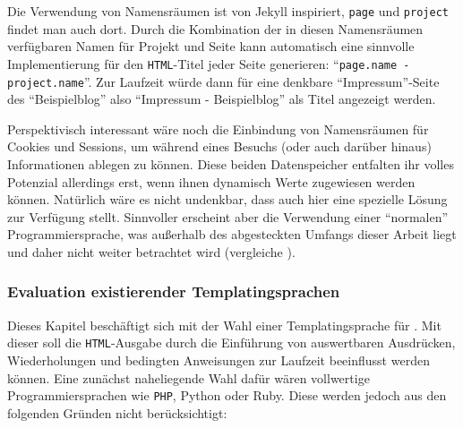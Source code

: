 Die Verwendung von Namensräumen ist von Jekyll inspiriert, \texttt{page} und \texttt{project} findet man auch dort. Durch die Kombination der in diesen Namensräumen verfügbaren Namen für Projekt und Seite kann \idename{} automatisch eine sinnvolle Implementierung für den \texttt{HTML}-Titel jeder Seite generieren: "`\texttt{page.name - project.name}"'. Zur Laufzeit würde dann für eine denkbare "`Impressum"'-Seite des "`Beispielblog"' also "`Impressum - Beispielblog"' als Titel angezeigt werden.

Perspektivisch interessant wäre noch die Einbindung von Namensräumen für Cookies und Sessions, um während eines Besuchs (oder auch darüber hinaus) Informationen ablegen zu können. Diese beiden Datenspeicher entfalten ihr volles Potenzial allerdings erst, wenn ihnen dynamisch Werte zugewiesen werden können. Natürlich wäre es nicht undenkbar, dass \idename{} auch hier eine spezielle Lösung zur Verfügung stellt. Sinnvoller erscheint aber die Verwendung einer "`normalen"' Programmiersprache, was außerhalb des abgesteckten Umfangs dieser Arbeit liegt und daher nicht weiter betrachtet wird (vergleiche ).

\subsubsection{Evaluation existierender Templatingsprachen}
\label{sec:eval-templating-language}

Dieses Kapitel beschäftigt sich mit der Wahl einer Templatingsprache für \idename{}. Mit dieser soll die \texttt{HTML}-Ausgabe durch die Einführung von auswertbaren Ausdrücken, Wiederholungen und bedingten Anweisungen zur Laufzeit beeinflusst werden können. Eine zunächst naheliegende Wahl dafür wären vollwertige Programmiersprachen wie \texttt{PHP}, Python oder Ruby. Diese werden jedoch aus den folgenden Gründen nicht berücksichtigt:

